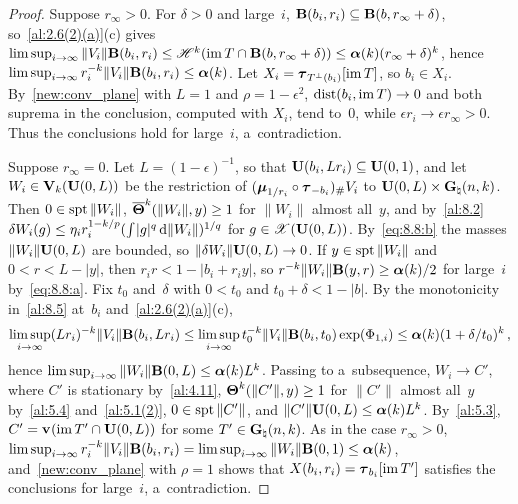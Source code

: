 \begin{proof}
    Suppose $r_\infty > 0$. For $\delta > 0$ and large~$i$, $\mathbf{B}(b_i,r_i) \subseteq
    \mathbf{B}(b,r_\infty + \delta)$, so~\ref{al:2.6(2)(a)}(c) gives $\limsup_{i \to \infty} \|V_i\|
    \mathbf{B}(b_i,r_i) \le \mathscr{H}^{k}(\operatorname{im} T \cap \mathbf{B}(b,r_\infty + \delta)) \le
    \boldsymbol{\alpha}(k) (r_\infty + \delta)^{k}$, hence $\limsup_{i \to \infty} r_i^{-k}
    \|V_i\| \mathbf{B}(b_i,r_i) \le \boldsymbol{\alpha}(k)$. Let $X_i = \boldsymbol{\tau}_{T^\perp(b_i)}[\operatorname{im} T]$, so
    $b_i \in X_i$. By~\ref{new:conv_plane} with $L = 1$ and $\rho = 1 - \epsilon^2$,
    $\operatorname{dist}(b_i, \operatorname{im} T) \to 0$ and both suprema in the conclusion, computed with $X_i$, tend to~$0$,
    while $\epsilon r_i \to \epsilon r_\infty > 0$. Thus the conclusions hold for large~$i$,
    a~contradiction.

    Suppose $r_\infty = 0$. Let $L = (1 - \epsilon)^{-1}$, so that $\mathbf{U}(b_i,L r_i) \subseteq
    \mathbf{U}(0,1)$, and let $W_i \in \mathbf{V}_{k}(\mathbf{U}(0,L))$ be the restriction of $(\boldsymbol{\mu}_{1/r_i}
    \circ \boldsymbol{\tau}_{-b_i})_\# V_i$ to $\mathbf{U}(0,L) \times \mathbf{G}_{\natural}(n,k)$. Then $0 \in \operatorname{spt}
    \|W_i\|$, $\boldsymbol{\overline{\Theta}}^{k}(\|W_i\|,y) \ge 1$ for $\|W_i\|$ almost all~$y$, and by~\ref{al:8.2}
    $\delta W_i(g) \le \eta_i r_i^{1 - k/p} ({\textstyle\int_{}^{}} |g|^q \,\mathrm{d} \|W_i\|)^{1/q}$ for $g \in
    \mathscr{X}(\mathbf{U}(0,L))$. By~\eqref{eq:8.8:b} the masses $\|W_i\| \mathbf{U}(0,L)$ are bounded, so
    $\|\delta W_i\| \mathbf{U}(0,L) \to 0$. If $y \in \operatorname{spt} \|W_i\|$ and $0 < r < L - |y|$, then
    $r_i r < 1 - |b_i + r_i y|$, so $r^{-k} \|W_i\| \mathbf{B}(y,r) \ge \boldsymbol{\alpha}(k)/2$ for
    large~$i$ by~\eqref{eq:8.8:a}. Fix $t_0$ and~$\delta$ with $0 < t_0$ and $t_0 + \delta < 1 -
    |b|$. By the monotonicity in~\ref{al:8.5} at~$b_i$ and~\ref{al:2.6(2)(a)}(c),
    \begin{displaymath}
        \limsup_{i \to \infty} (L r_i)^{-k} \|V_i\| \mathbf{B}(b_i,L r_i) \le \limsup_{i \to \infty}
        t_0^{-k} \|V_i\| \mathbf{B}(b_i,t_0) \exp(\Phi_{1,i}) \le \boldsymbol{\alpha}(k) (1 +
        \delta/t_0)^{k} \,,
    \end{displaymath}
    hence $\limsup_{i \to \infty} \|W_i\| \mathbf{B}(0,L) \le \boldsymbol{\alpha}(k) L^{k}$. Passing to
    a~subsequence, $W_i \to C'$, where $C'$ is stationary by~\ref{al:4.11}, $\boldsymbol{\Theta}^{k}(\|C'\|,y)
    \ge 1$ for $\|C'\|$ almost all~$y$ by~\ref{al:5.4} and~\ref{al:5.1(2)}, $0 \in \operatorname{spt} \|C'\|$, and
    $\|C'\| \mathbf{U}(0,L) \le \boldsymbol{\alpha}(k) L^{k}$. By~\ref{al:5.3}, $C' = \mathbf{v}_{}(\operatorname{im} T'
    \cap \mathbf{U}(0,L))$ for some $T' \in \mathbf{G}_{\natural}(n,k)$. As in the case $r_\infty > 0$,
    $\limsup_{i \to \infty} r_i^{-k} \|V_i\| \mathbf{B}(b_i,r_i) = \limsup_{i \to \infty} \|W_i\|
    \mathbf{B}(0,1) \le \boldsymbol{\alpha}(k)$, and~\ref{new:conv_plane} with $\rho = 1$ shows that
    $X(b_i,r_i) = \boldsymbol{\tau}_{b_i}[\operatorname{im} T']$ satisfies the conclusions for large~$i$, a~contradiction.
\end{proof}

